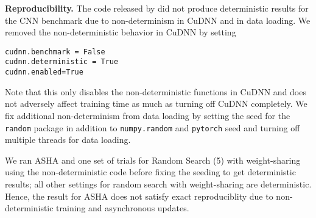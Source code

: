 \documentclass[acmlarge, nonacm]{acmart}
\begin{document}
\textbf{Reproducibility.}
The code released by \citet{liu2018darts} did not produce deterministic results for the CNN benchmark due to non-determinism in CuDNN and in data loading.  We removed the non-deterministic behavior in CuDNN by setting
\begin{verbatim}
cudnn.benchmark = False
cudnn.deterministic = True
cudnn.enabled=True
\end{verbatim}
Note that this only disables the non-deterministic functions in CuDNN and does not adversely affect training time as much as turning off CuDNN completely.  We fix additional non-determinism from data loading by setting the seed for the \texttt{random} package in addition to \texttt{numpy.random} and \texttt{pytorch} seed and turning off multiple threads for data loading.

We ran ASHA and one set of trials for Random Search (5) with weight-sharing using the non-deterministic code before fixing the seeding to get deterministic results; all other settings for random search with weight-sharing are deterministic.  Hence, the result for ASHA does not satisfy exact reproduciblity due to non-deterministic training and asynchronous updates.  




\end{document}

